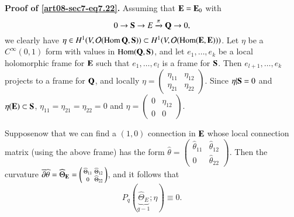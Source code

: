 \noindent
{\bf Proof of \eqref{art08-sec7-eq7.22}.} Assuming that $\mathbf{E}=\mathbf{E}_{0}$ with
\begin{equation}
0\to \mathbf{S}\to E\xrightarrow{\pi}\mathbf{Q}\to 0,\label{art08-sec7-eq7.23}
\end{equation}
we clearly have $\eta\in H^{1}(V,\mathcal{O}(\operatorname{\mathrm{Hom}} \mathbf{Q},\mathbf{S}))\subset H^{1}(V,\mathcal{O}(\operatorname{\mathrm{Hom}}(\mathbf{E},\mathbf{E})))$. Let $\eta$ be a $C^{\infty}(0,1)$ form with values in $\operatorname{\mathrm{Hom}}(\mathbf{Q},\mathbf{S})$, and let $e_{1},\ldots,e_{k}$ be a local holomorphic frame for $\mathbf{E}$ such that $e_{1},\ldots,e_{l}$ is a frame for $\mathbf{S}$. Then $e_{l+1},\ldots,e_{k}$ projects to a frame for $\mathbf{Q}$, and locally $\eta=\left(\begin{smallmatrix} \eta_{11} & \eta_{12}\\ \eta_{21} & \eta_{22}\end{smallmatrix}\right)$. Since $\eta|\mathbf{S}=0$ and $\eta(\mathbf{E})\subset \mathbf{S}$, $\eta_{11}=\eta_{21}=\eta_{22}=0$ and $\eta=\left(\begin{smallmatrix} 0 & \eta_{12}\\ 0 & 0\end{smallmatrix}\right)$.

Suppose\pageoriginale now that we can find a $(1,0)$ connection in $\mathbf{E}$ whose local connection matrix (using the above frame) has the form $\widehat{\theta}=\left(\begin{smallmatrix} \widehat{\theta}_{11} & \widehat{\theta}_{12}\\ 0 & \widehat{\theta}_{22}\end{smallmatrix}\right)$. Then the curvature $\overline{\partial}\widehat{\theta}=\widehat{\Theta}_{\mathbf{E}}=\left(\begin{smallmatrix} \widehat{\Theta}_{11} & \widehat{\Theta}_{12}\\ 0 & \widehat{\Theta}_{22}\end{smallmatrix}\right)$, and it follows that 
$$
P_{q}(\underbrace{\widehat{\Theta}_{E}}_{q-1};\eta)\equiv 0.
$$

